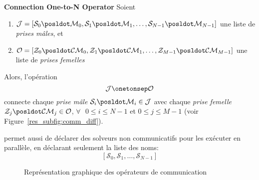 \begin{lemma}\label{res_op_conn:1ton}
{\bf Connection One-to-N Operator} Soient 
\begin{enumerate} 
\item $\mathcal{J} = \left[\mathcal{S}_0\posldot \mathcal{M}_0, \mathcal{S}_1\posldot \mathcal{M}_1,\dots, \mathcal{S}_{N-1}\posldot \mathcal{M}_{N-1}\right]$ une liste de  {\it prises mâles}, et
\item $\mathcal{O} = \left[\mathcal{Z}_0\posldot \mathcal{CM}_0, \mathcal{Z}_1\posldot \mathcal{CM}_1,\dots, \mathcal{Z}_{M-1}\posldot \mathcal{CM}_{M-1}\right]$ une liste de {\it prises femelles}
\end{enumerate} Alors, l'opération
\[
\mathcal{J} \onetonsep \mathcal{O}
\]
connecte chaque {\it prise mâle} $\mathcal{S}_i\posldot \mathcal{M}_i \in \mathcal{J}$ avec chaque {\it prise femelle} $\mathcal{Z}_j\posldot \mathcal{CM}_j \in \mathcal{O}$, $\forall\textbf{ }0 \leq i \leq N-1$ et $0 \leq j \leq M-1$ (voir Figure~\ref{res_subfig:comm_diff}).
\end{lemma}


\posl{} permet aussi de déclarer des solveurs non communicatifs pour les exécuter en parallèle, en déclarant seulement la liste des noms:
\[
\left[\mathcal{S}_0, \mathcal{S}_1, \dots, \mathcal{S}_{N-1}\right]
\]

\begin{figure}[t]
\centering
{}
\hspace{0.05\textwidth}%
\caption[]{Représentation graphique des opérateurs de communication}
\label{res_fig:comm}
\end{figure}